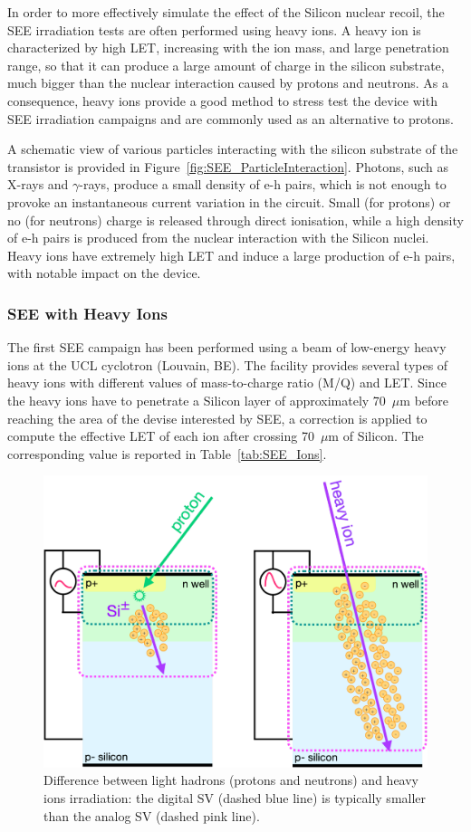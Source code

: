 In order to more effectively simulate the effect of the Silicon nuclear recoil, the SEE irradiation tests are often performed using heavy ions. 
A heavy ion is characterized by high LET, increasing with the ion mass, and large penetration range, so that it can produce a large amount of charge in the silicon substrate, much bigger than the nuclear interaction caused by protons and neutrons.
As a consequence, heavy ions provide a good method to stress test the device with SEE irradiation campaigns and are commonly used as an alternative to protons.

\bigbreak

A schematic view of various particles interacting with the silicon substrate of the transistor is provided in Figure~\ref{fig:SEE_ParticleInteraction}.
Photons, such as X-rays and $\gamma$-rays, produce a small density of e-h pairs, which is not enough to provoke an instantaneous current variation in the circuit. 
Small (for protons) or no (for neutrons) charge is released through direct ionisation, while a high density of e-h pairs is produced from the nuclear interaction with the Silicon nuclei. Heavy ions have extremely high LET and induce a large production of e-h pairs, with notable impact on the device.


\subsubsection{SEE with Heavy Ions}
\label{subsubsec:SEE with Heavy Ions}

The first SEE campaign has been performed using a beam of low-energy heavy ions at the UCL cyclotron (Louvain, BE).
The facility provides several types of heavy ions with different values of mass-to-charge ratio (M/Q) and LET.
Since the heavy ions have to penetrate a Silicon layer of approximately 70~$\mu$m before reaching the area of the devise interested by SEE, a correction is applied to compute the effective LET of each ion after crossing 70~$\mu$m of Silicon. The corresponding value is reported in Table~\ref{tab:SEE_Ions}.

\begin{figure}[t]
    \centering
    \includegraphics[width=0.45\linewidth]{Figures/HGCAL/SEE_SV.pdf}
    \caption{Difference between light hadrons (protons and neutrons) and heavy ions irradiation: the digital SV (dashed blue line) is typically smaller than the analog SV (dashed pink line).}
    \label{fig:sensitivevolume}
\end{figure}

